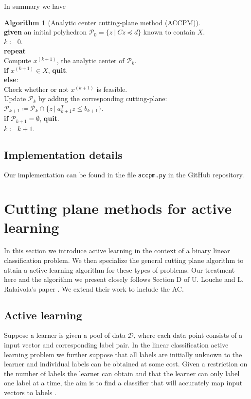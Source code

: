 \documentclass[11pt]{amsart}
\theoremstyle{definition}
\newtheorem{algorithm}{Algorithm}
\theoremstyle{remark}
\newcommand{\ind}{\hspace*{0.5cm}}
\newcommand{\transpose}{T}
\begin{document}
        In summary we have
        \begin{algorithm}[Analytic center cutting-plane method (ACCPM)]
        \label{a:accpm}\mbox{}\\
            \ind \textbf{given} an initial polyhedron $\mathcal{P}_0 = \{z \:|\: Cz \preceq d\}$ known to contain $X$. \\
            \ind $k \coloneqq 0$. \\
            \ind \textbf{repeat} \\
            \ind\ind Compute $x^{(k+1)}$, the analytic center of $\mathcal{P}_k$. \\
            \ind\ind \textbf{if} $x^{(k+1)} \in X$, \textbf{quit}. \\
            \ind\ind \textbf{else}:\\
            \ind\ind\ind Check whether or not $x^{(k+1)}$ is feasible. \\
            \ind\ind\ind Update $\mathcal{P}_k$ by adding the corresponding cutting-plane: \\
            \ind\ind\ind\ind $\mathcal{P}_{k+1} \coloneqq \mathcal{P}_k \cap \{z \:|\: a_{k+1}^\transpose z \leq b_{k+1} \}$. \\
            \ind\ind \textbf{if} $\mathcal{P}_{k+1} = \emptyset$, \textbf{quit}. \\
            \ind\ind $k \coloneqq k+1$.
        \end{algorithm}

        \subsection{Implementation details} Our implementation can be found in the file \texttt{accpm.py} in the GitHub repository. 

\section{Cutting plane methods for active learning}\label{s:cp_active}
    In this section we introduce active learning in the context of a binary linear classification problem. We then specialize the general cutting plane algorithm to attain a active learning algorithm for these types of problems. Our treatment here and the algorithm we present closely follows Section D of U. Louche and L. Ralaivola's paper \cite{LR15}. We extend their work to include the AC.

    \subsection{Active learning}\label{ss:active}
        Suppose a learner is given a pool of data $\mathcal{D}$, where each data point consists of a input vector and corresponding label pair. In the linear classification active learning problem we further suppose that all labels are initially unknown to the learner and individual labels can be obtained at some cost. Given a restriction on the number of labels the learner can obtain and that the learner can only label one label at a time, the aim is to find a classifier that will accurately map input vectors to labels \cite{Das11}. 
\end{document}
